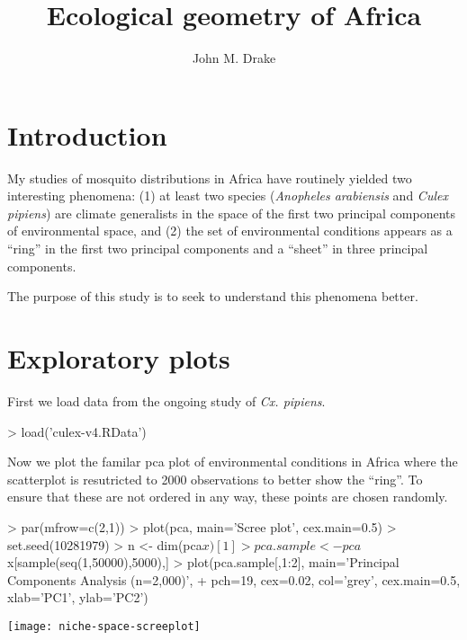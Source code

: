 \documentclass[10pt]{article}
\title{Ecological geometry of Africa}
\author{John M. Drake}
\renewenvironment{Schunk}{\vspace{\topsep}}{\vspace{\topsep}}
\begin{document}


\maketitle
  
\section{Introduction}
  
My studies of mosquito distributions in Africa have routinely yielded two interesting phenomena: (1) at least two species (\textit{Anopheles arabiensis} and \textit{Culex pipiens}) are climate generalists in the space of the first two principal components of environmental space, and (2) the set of environmental conditions appears as a ``ring'' in the first two principal components and a ``sheet'' in three principal components.

The purpose of this study is to seek to understand this phenomena better.

\section{Exploratory plots}

First we load data from the ongoing study of \textit{Cx. pipiens}. 

\begin{Schunk}
\begin{Sinput}
> load('culex-v4.RData')
\end{Sinput}
\end{Schunk}

Now we plot the familar pca plot of environmental conditions in Africa where the scatterplot is resutricted to 2000 observations to better show the ``ring''. To ensure that these are not ordered in any way, these points are chosen randomly.

\begin{Schunk}
\begin{Sinput}
> par(mfrow=c(2,1))
> plot(pca, main='Scree plot', cex.main=0.5)
> set.seed(10281979)
> n <- dim(pca$x)[1]
> pca.sample <- pca$x[sample(seq(1,50000),5000),]
> plot(pca.sample[,1:2], main='Principal Components Analysis (n=2,000)',
+      pch=19, cex=0.02, col='grey', cex.main=0.5, xlab='PC1', ylab='PC2')
\end{Sinput}
\end{Schunk}
\texttt{[image: niche-space-screeplot]}
\end{document}
